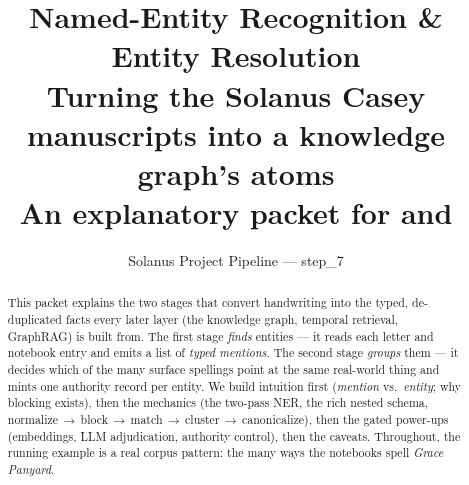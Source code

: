 \documentclass[11pt]{article}
\title{\bfseries Named-Entity Recognition \& Entity Resolution\\[2pt]
\large Turning the Solanus Casey manuscripts into a knowledge graph's atoms\\[2pt]
\normalsize An explanatory packet for \file{stages/extract\_entities.py} and
\file{stages/resolve\_entities.py}}
\author{Solanus Project Pipeline --- step\_7}
\date{}
\begin{document}
\maketitle

\begin{abstract}
This packet explains the two stages that convert handwriting into the typed,
de-duplicated facts every later layer (the knowledge graph, temporal retrieval,
GraphRAG) is built from. The first stage \emph{finds} entities --- it reads each
letter and notebook entry and emits a list of \emph{typed mentions}. The second
stage \emph{groups} them --- it decides which of the many surface spellings point
at the same real-world thing and mints one authority record per entity. We build
intuition first (\emph{mention} vs.\ \emph{entity}; why blocking exists), then the
mechanics (the two-pass NER, the rich nested schema, normalize\,$\to$\,block\,$\to$\,match\,$\to$\,cluster\,$\to$\,canonicalize), then the gated power-ups
(embeddings, LLM adjudication, authority control), then the caveats. Throughout,
the running example is a real corpus pattern: the many ways the notebooks spell
\emph{Grace Panyard}.
\end{abstract}

\tableofcontents
\bigskip
\end{document}
